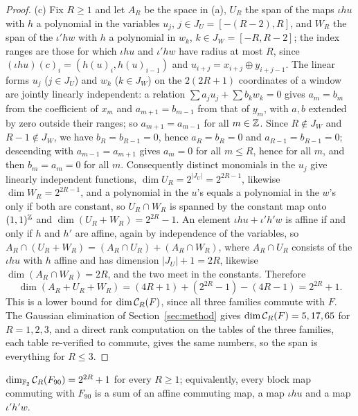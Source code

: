 \begin{proof}
(c) Fix $R\ge1$ and let $A_R$ be the space in (a), $U_R$ the span of the maps $\iota hu$ with $h$ a polynomial in the variables $u_j$, $j\in J_U=[-(R-2),R]$, and $W_R$ the span of the $\iota'hw$ with $h$ a polynomial in $w_k$, $k\in J_W=[-R,R-2]$; the index ranges are those for which $\iota hu$ and $\iota'hw$ have radius at most $R$, since $(\iota hu)(c)_i=(h(u)_i,h(u)_{i-1})$ and $u_{i+j}=x_{i+j}\oplus y_{i+j-1}$. The linear forms $u_j$ ($j\in J_U$) and $w_k$ ($k\in J_W$) on the $2(2R+1)$ coordinates of a window are jointly linearly independent: a relation $\sum a_ju_j+\sum b_kw_k=0$ gives $a_m=b_m$ from the coefficient of $x_m$ and $a_{m+1}=b_{m-1}$ from that of $y_m$, with $a,b$ extended by zero outside their ranges; so $a_{m+1}=a_{m-1}$ for all $m\in\mathbb{Z}$. Since $R\notin J_W$ and $R-1\notin J_W$, we have $b_R=b_{R-1}=0$, hence $a_R=b_R=0$ and $a_{R-1}=b_{R-1}=0$; descending with $a_{m-1}=a_{m+1}$ gives $a_m=0$ for all $m\le R$, hence for all $m$, and then $b_m=a_m=0$ for all $m$. Consequently distinct monomials in the $u_j$ give linearly independent functions, $\dim U_R=2^{|J_U|}=2^{2R-1}$, likewise $\dim W_R=2^{2R-1}$, and a polynomial in the $u$'s equals a polynomial in the $w$'s only if both are constant, so $U_R\cap W_R$ is spanned by the constant map onto $(1,1)^{\mathbb{Z}}$ and $\dim(U_R+W_R)=2^{2R}-1$. An element $\iota hu+\iota'h'w$ is affine if and only if $h$ and $h'$ are affine, again by independence of the variables, so $A_R\cap(U_R+W_R)=(A_R\cap U_R)+(A_R\cap W_R)$, where $A_R\cap U_R$ consists of the $\iota hu$ with $h$ affine and has dimension $|J_U|+1=2R$, likewise $\dim(A_R\cap W_R)=2R$, and the two meet in the constants. Therefore
\[
\dim(A_R+U_R+W_R)=(4R+1)+(2^{2R}-1)-(4R-1)=2^{2R}+1 .
\]
This is a lower bound for $\dim\mathcal{C}_R(F)$, since all three families commute with $F$. The Gaussian elimination of Section~\ref{sec:method} gives $\dim\mathcal{C}_R(F)=5,17,65$ for $R=1,2,3$, and a direct rank computation on the tables of the three families, each table re-verified to commute, gives the same numbers, so the span is everything for $R\le3$.
\end{proof}

\begin{conjecture}
$\dim_{\mathbb{F}_2}\mathcal{C}_R(F_{90})=2^{2R}+1$ for every $R\ge1$; equivalently, every block map commuting with $F_{90}$ is a sum of an affine commuting map, a map $\iota hu$ and a map $\iota'h'w$.
\end{conjecture}

